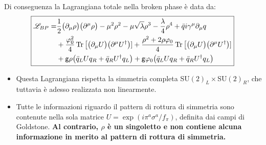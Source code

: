 \documentclass[../main.tex]{subfiles}
\begin{document}
Di conseguenza la Lagrangiana totale nella broken phase è data da:
\begin{equation}
    \boxed{\begin{aligned}
       \mathscr{L}_{BP} =& \frac{1}{2}\big(\partial_\mu \rho\big)\big(\partial^\mu \rho\big) - \mu^2\rho^2 - \mu\sqrt{\lambda}\rho^3 -\frac{\lambda}{4}\rho^4 +\bar q i\gamma^\mu\partial_\mu q \\
       &+\frac{\varphi_0^2}{4}\Tr\big[\big(\partial_\mu U\big)\big(\partial^\mu U^\dagger\big)] + \frac{\rho^2+2\rho\varphi_0}{4}\Tr\big[\big(\partial_\mu U\big)\big(\partial^\mu U^\dagger\big)] \\
       &+\mathsf{g}\rho\big(\bar q_L U q_R + \bar q_R U^\dagger q_L\big) + \mathsf{g}\varphi_0\big(\bar q_L U q_R + \bar q_R U^\dagger q_L\big)
    \end{aligned}}
    \label{eq:nonlinear_lagrangian_SU2_V+fermions}
\end{equation}
\begin{itemize}
    \item[\blacklozenge] Questa Lagrangiana rispetta la simmetria completa SU$(2)_L\times$SU$(2)_R$, che tuttavia è adesso realizzata non linearmente.

    \item[\blacklozenge] Tutte le informazioni riguardo il pattern di rottura di simmetria sono contenute nella sola matrice $U = \exp(i\pi^a\sigma^a/f_\pi)$, definita dai campi di Goldstone.
    \textbf{Al contrario, $\rho$ è un singoletto e non contiene alcuna informazione in merito al pattern di rottura di simmetria.}
\end{itemize}
\end{document}
